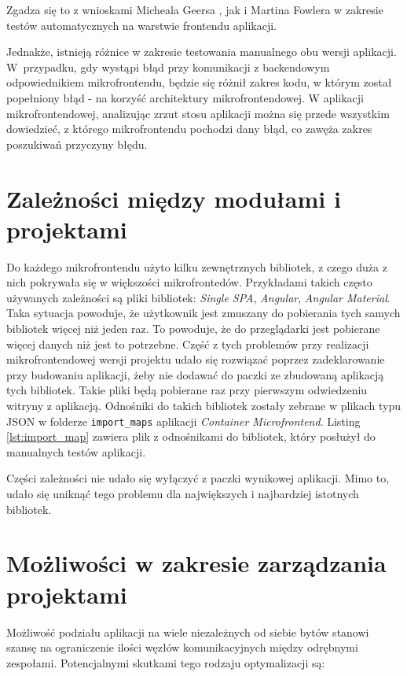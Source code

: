 \documentclass{SGGW-thesis}
\begin{document}
  Zgadza się to z wnioskami Micheala Geersa \cite{geers_2020}, jak i Martina Fowlera \cite{fowler_2019} w zakresie testów automatycznych na warstwie frontendu aplikacji.

  Jednakże, istnieją różnice w zakresie testowania manualnego obu wersji aplikacji. W~przypadku, gdy wystąpi błąd przy komunikacji z backendowym odpowiednikiem mikrofrontendu, będzie się różnił zakres kodu, w którym został popełniony błąd - na korzyść architektury mikrofrontendowej. W aplikacji mikrofrontendowej, analizując zrzut stosu aplikacji można się przede wszystkim dowiedzieć, z którego mikrofrontendu pochodzi dany błąd, co zawęża zakres poszukiwań przyczyny błędu.

  \section{Zależności między modułami i projektami}
  Do każdego mikrofrontendu użyto kilku zewnętrznych bibliotek, z czego duża z nich pokrywała się w większości mikrofrontedów. Przykładami takich często używanych zależności są pliki bibliotek: \textit{Single SPA}, \textit{Angular}, \textit{Angular Material}. Taka sytuacja powoduje, że użytkownik jest zmuszany do pobierania tych samych bibliotek więcej niż jeden raz. To powoduje, że do przeglądarki jest pobierane więcej danych niż jest to potrzebne. Część z tych problemów przy realizacji mikrofrontendowej wersji projektu udało się rozwiązać poprzez zadeklarowanie przy budowaniu aplikacji, żeby nie dodawać do paczki ze zbudowaną aplikacją tych bibliotek. Takie pliki będą pobierane raz przy pierwszym odwiedzeniu witryny z aplikacją. Odnośniki do takich bibliotek zostały zebrane w plikach typu JSON w folderze \lstinline{import_maps} aplikacji \textit{Container Microfrontend}. Listing \cref{lst:import_map} zawiera plik z odnośnikami do bibliotek, który posłużył do manualnych testów aplikacji.

  

  Części zależności nie udało się wyłączyć z paczki wynikowej aplikacji. Mimo to, udało się uniknąć tego problemu dla największych i najbardziej istotnych bibliotek.

  \pagebreak

  \section{Możliwości w zakresie zarządzania projektami}
  Możliwość podziału aplikacji na wiele niezależnych od siebie bytów stanowi szansę na ograniczenie ilości węzłów komunikacyjnych między odrębnymi zespołami. Potencjalnymi skutkami tego rodzaju optymalizacji są:
\end{document}
